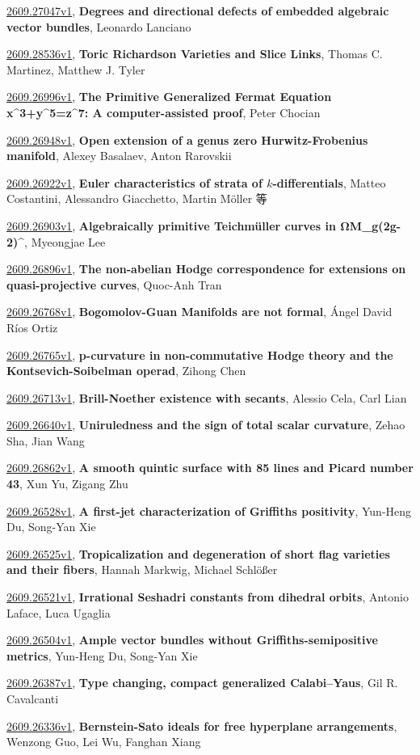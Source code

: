 \documentclass[9pt, a4paper]{article}
\theoremstyle{plain}
\theoremstyle{definition}
\theoremstyle{remark}
\newcommand{\arxiv}[3]{\href{https://arxiv.org/abs/#1}{#1}, \textbf{\textcolor{arxivblue}{#2}}, #3}
\begin{document}
\arxiv{2609.27047v1}{Degrees and directional defects of embedded algebraic vector bundles}{Leonardo Lanciano}

\arxiv{2609.28536v1}{Toric Richardson Varieties and Slice Links}{Thomas C. Martinez, Matthew J. Tyler}

\arxiv{2609.26996v1}{The Primitive Generalized Fermat Equation x^3+y^5=z^7: A computer-assisted proof}{Peter Chocian}

\arxiv{2609.26948v1}{Open extension of a genus zero Hurwitz-Frobenius manifold}{Alexey Basalaev, Anton Rarovskii}

\arxiv{2609.26922v1}{Euler characteristics of strata of $k$-differentials}{Matteo Costantini, Alessandro Giacchetto, Martin Möller 等}

\arxiv{2609.26903v1}{Algebraically primitive Teichmüller curves in Ω\mathcal M_g(2g-2)^{\mathrm{hyp}}}{Myeongjae Lee}

\arxiv{2609.26896v1}{The non-abelian Hodge correspondence for extensions on quasi-projective curves}{Quoc-Anh Tran}

\arxiv{2609.26768v1}{Bogomolov-Guan Manifolds are not formal}{Ángel David Ríos Ortiz}

\arxiv{2609.26765v1}{p-curvature in non-commutative Hodge theory and the Kontsevich-Soibelman operad}{Zihong Chen}

\arxiv{2609.26713v1}{Brill-Noether existence with secants}{Alessio Cela, Carl Lian}

\arxiv{2609.26640v1}{Uniruledness and the sign of total scalar curvature}{Zehao Sha, Jian Wang}

\arxiv{2609.26862v1}{A smooth quintic surface with 85 lines and Picard number 43}{Xun Yu, Zigang Zhu}

\arxiv{2609.26528v1}{A first-jet characterization of Griffiths positivity}{Yun-Heng Du, Song-Yan Xie}

\arxiv{2609.26525v1}{Tropicalization and degeneration of short flag varieties and their fibers}{Hannah Markwig, Michael Schlößer}

\arxiv{2609.26521v1}{Irrational Seshadri constants from dihedral orbits}{Antonio Laface, Luca Ugaglia}

\arxiv{2609.26504v1}{Ample vector bundles without Griffiths-semipositive metrics}{Yun-Heng Du, Song-Yan Xie}

\arxiv{2609.26387v1}{Type changing, compact generalized Calabi--Yaus}{Gil R. Cavalcanti}

\arxiv{2609.26336v1}{Bernstein-Sato ideals for free hyperplane arrangements}{Wenzong Guo, Lei Wu, Fanghan Xiang}
\end{document}
